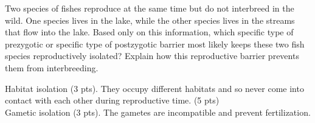\question[10]
Two species of fishes reproduce at the same time but do not interbreed in the wild. One species lives in the lake, while the other species lives in the streams that flow into the lake.  Based only on this information, which specific type of prezygotic or specific type of postzygotic barrier most likely keeps these two fish species reproductively isolated? Explain how this reproductive barrier prevents them from interbreeding. 

\begin{solution}
Habitat isolation (3 pts). They occupy different habitats and so never come into contact with each other during reproductive time. (5 pts)\\
Gametic isolation (3 pts). The gametes are incompatible and prevent fertilization.
\end{solution}
